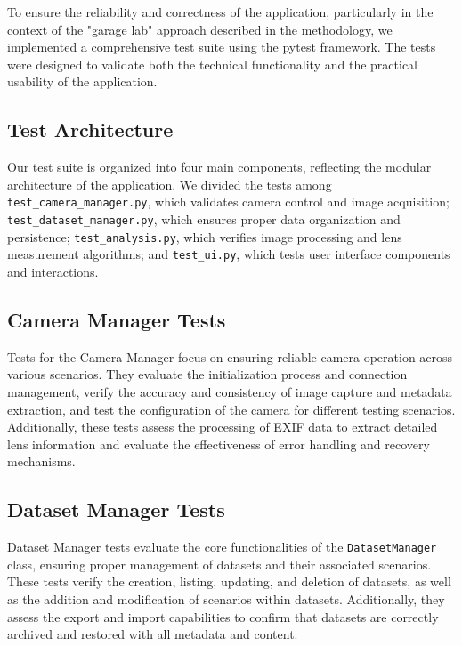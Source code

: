 To ensure the reliability and correctness of the application, particularly in the context of the "garage lab" approach described in the methodology, we implemented a comprehensive test suite using the pytest framework. The tests were designed to validate both the technical functionality and the practical usability of the application.

\subsection{Test Architecture}

Our test suite is organized into four main components, reflecting the modular architecture of the application. We divided the tests among \texttt{test\_camera\_manager.py}, which validates camera control and image acquisition; \texttt{test\_dataset\_manager.py}, which ensures proper data organization and persistence; \texttt{test\_analysis.py}, which verifies image processing and lens measurement algorithms; and \texttt{test\_ui.py}, which tests user interface components and interactions.

\subsection{Camera Manager Tests}

Tests for the Camera Manager focus on ensuring reliable camera operation across various scenarios. They evaluate the initialization process and connection management, verify the accuracy and consistency of image capture and metadata extraction, and test the configuration of the camera for different testing scenarios. Additionally, these tests assess the processing of EXIF data to extract detailed lens information and evaluate the effectiveness of error handling and recovery mechanisms.

\subsection{Dataset Manager Tests}

Dataset Manager tests evaluate the core functionalities of the \texttt{DatasetManager} class, ensuring proper management of datasets and their associated scenarios. These tests verify the creation, listing, updating, and deletion of datasets, as well as the addition and modification of scenarios within datasets. Additionally, they assess the export and import capabilities to confirm that datasets are correctly archived and restored with all metadata and content.

